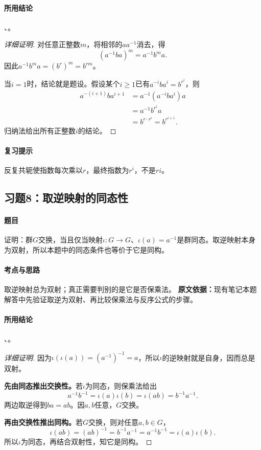 \paragraph{所用结论}
、。
\begin{proof}[详细证明]
对任意正整数$m$，将相邻的$aa^{-1}$消去，得
\[
(a^{-1}ba)^m=a^{-1}b^ma.
\]
因此$a^{-1}b^ma=(b^r)^m=b^{rm}$。

当$i=1$时，结论就是题设。假设某个$i\geq1$已有$a^{-i}ba^i=b^{r^i}$，则
\begin{align*}
a^{-(i+1)}ba^{i+1}
&=a^{-1}(a^{-i}ba^i)a\\
&=a^{-1}b^{r^i}a\\
&=b^{r\cdot r^i}=b^{r^{i+1}}.
\end{align*}
归纳法给出所有正整数$i$的结论。
\end{proof}
\paragraph{复习提示}
反复共轭使指数每次乘以$r$，最终指数为$r^i$，不是$ri$。

\subsection{习题8：取逆映射的同态性}
\paragraph{题目}
证明：群$G$交换，当且仅当映射$\iota:G\to G$、$\iota(a)=a^{-1}$是群同态。取逆映射本身为双射，所以本题中的同态条件也等价于它是同构。
\paragraph{考点与思路}
取逆映射总为双射；真正需要判别的是它是否保乘法。
\textbf{原文依据：}现有笔记本题解答中先验证取逆为双射、再比较保乘法与反序公式的步骤。
\paragraph{所用结论}
、。
\begin{proof}[详细证明]
因为$\iota(\iota(a))=(a^{-1})^{-1}=a$，所以$\iota$的逆映射就是自身，因而总是双射。

\textbf{先由同态推出交换性。}若$\iota$为同态，则保乘法给出
\[
a^{-1}b^{-1}=\iota(a)\iota(b)=\iota(ab)=b^{-1}a^{-1}.
\]
两边取逆得到$ba=ab$。因$a,b$任意，$G$交换。

\textbf{再由交换性推出同构。}若$G$交换，则对任意$a,b\in G$，
\[
\iota(ab)=(ab)^{-1}=b^{-1}a^{-1}=a^{-1}b^{-1}=\iota(a)\iota(b).
\]
所以$\iota$为同态，再结合双射性，知它是同构。
\end{proof}

